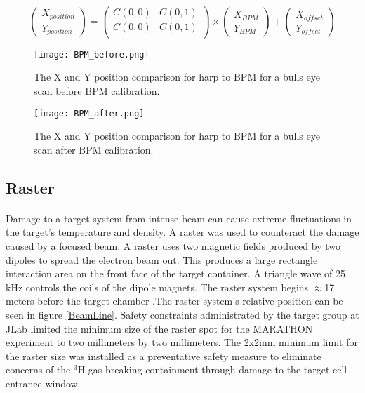 		\paragraph{}
		\begin{equation}
		\label{BPM_eq}
		\begin{pmatrix}
		X_{position}\\
		Y_{position}
		\end{pmatrix}
		=
		\begin{pmatrix}
		C(0,0) & C(0,1)\\
		C(0,0) & C(0,1)\\
		\end{pmatrix}
		\times
		\begin{pmatrix}
		X_{BPM}\\
		Y_{BPM}
		\end{pmatrix}
		+
		\begin{pmatrix}
		X_{offset}\\
		Y_{offset}
		\end{pmatrix}			 
		\end{equation}

		\begin{figure}[]
			\centering
			\texttt{[image: BPM\_before.png]} 
			\caption{The X and Y position comparison for harp to BPM for a bulls eye scan before BPM calibration. }
			\label{bullsB}
			\centering
			\texttt{[image: BPM\_after.png]} 
			\caption{The X and Y position comparison for harp to BPM for a bulls eye scan after BPM calibration. }
			\label{bulls}
		\end{figure} 	

	 \subsection{Raster}
	
	 \paragraph{}Damage to a target system from intense beam can cause extreme fluctuations in the target's temperature and density. A raster was used to counteract the damage caused by a focused beam. A raster uses two magnetic fields produced by two dipoles to spread the electron beam out. This produces a large rectangle interaction area on the front face of the target container. A triangle wave of 25 kHz controls the coils of the dipole magnets. The raster system begins $\approx$17 meters before the target chamber \cite{BPM2}.The raster system's relative position can be seen in figure \ref{BeamLine}. Safety constraints administrated by the target group at JLab limited the minimum size of the raster spot for the MARATHON experiment to two millimeters by two millimeters. The 2x2mm minimum limit for the raster size was installed as a preventative safety measure to eliminate concerns of the $^3$H gas breaking containment through damage to the target cell entrance window. 

